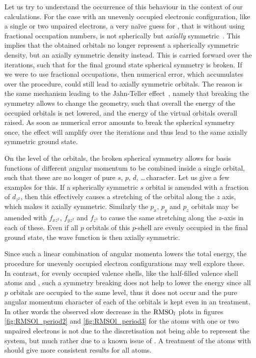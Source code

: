 Let us try to understand the occurrence of this behaviour
in the context of our calculations.
For the case with an unevenly occupied electronic configuration,
like a single or two unpaired electrons,
a very na\"{i}ve guess for \UHF,
that is without using fractional occupation numbers,
is not spherically but \emph{axially} symmetric~\cite{McWeeny1985}.
This implies that the obtained \SCF orbitals no longer represent
a spherically symmetric density, but an axially symmetric density instead.
This is carried forward over the iterations,
such that for the final \UHF ground state spherical symmetry is broken.
If we were to use fractional occupations,
then numerical error,
which accumulates over the \SCF procedure,
could still lead to axially symmetric \SCF orbitals.
The reason is the same mechanism leading to the Jahn-Teller effect~\cite{Jahn1937},
namely that breaking the symmetry
allows to change the geometry,
such that overall the energy of the occupied \SCF orbitals is net lowered,
and the energy of the virtual orbitals overall raised.
As soon as numerical error amounts to break the spherical
symmetry once,
the effect will amplify over the \UHF iterations
and thus lead to the same axially symmetric \UHF ground state.

On the level of the \SCF orbitals,
the broken spherical symmetry allows for \CS basis functions
of different angular momentum to be combined inside a single orbital,
such that these are no longer of pure
$s$, $p$, $d$, \ldots \,character.
Let us give a few examples for this.
If a spherically symmetric $s$ orbital is amended with
a fraction of $d_{z^2}$, then this effectively causes a stretching
of the orbital along the $z$ axis,
which makes it axially symmetric.
Similarly the $p_x$, $p_y$ and $p_z$ orbitals
may be amended with $f_{xz^2}$, $f_{yz^2}$ and $f_{z^3}$
to cause the same stretching along the $z$-axis in each of these.
Even if all $p$ orbitals of this $p$-shell are evenly occupied in the final \HF
ground state, the wave function is then axially symmetric.

Since such a linear combination of angular momenta lowers
the total \SCF energy,
the \UHF procedure for unevenly occupied electron configurations
may well explore these.
In contrast, for evenly occupied valence shells,
like the half-filled valence shell atoms  and ,
such a symmetry breaking does not help to lower
the energy since all $p$ orbitals are occupied to the same level,
thus it does not occur
and the pure angular momentum character of each of the orbitals is kept
even in an \UHF treatment.
In other words the observed slow decrease in the $\text{RMSO}_l$ plots
in figures \ref{fig:RMSOl_period2} and \ref{fig:RMSOl_period3}
for the atoms with one or two unpaired electrons
is not due to the \CS discretisation not being able to represent the system,
but much rather due to a known issue of \UHF.
A treatment of the atoms with \ROHF should give more consistent
results for all atoms.

